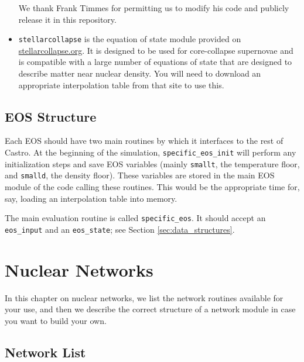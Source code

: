 \documentclass[11pt]{book}
\newcommand{\castro}{{\sf Castro}}
\begin{document}
\begin{itemize}
We thank Frank Timmes for permitting us to modify his code and publicly release 
it in this repository.

\item {\tt stellarcollapse} is the equation of state module provided on 
\href{stellarcollapse.org}{stellarcollapse.org}. It is designed to be used for 
core-collapse supernovae and is compatible with a large number of equations of 
state that are designed to describe matter near nuclear density. You will need to 
download an appropriate interpolation table from that site to use this.

\end{itemize}



\section{EOS Structure}

Each EOS should have two main routines by which it interfaces to the
rest of \castro.  At the beginning of the simulation, {\tt specific\_eos\_init}
will perform any initialization steps and save EOS variables (mainly
\texttt{smallt}, the temperature floor, and \texttt{smalld}, the
density floor). These variables are stored in the main EOS module of the 
code calling these routines. This would be the appropriate time for, say, 
loading an interpolation table into memory.

The main evaluation routine is called {\tt specific\_eos}. It should accept 
an {\tt eos\_input} and an {\tt eos\_state}; see Section \ref{sec:data_structures}.



\chapter{Nuclear Networks}

In this chapter on nuclear networks, we list the network routines available for your use, and 
then we describe the correct structure of a network module in case you want to build your own.

\section{Network List}
\end{document}

